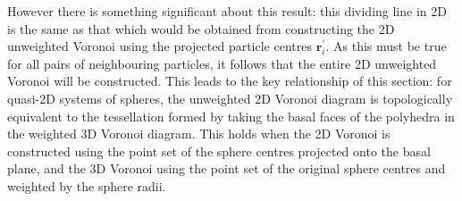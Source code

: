 However there is something significant about this result: this dividing line in 2D is the same as that which would be obtained from constructing the 2D unweighted Voronoi using the projected particle centres $\mathbf{r}^\prime_i$.
As this must be true for all pairs of neighbouring particles, it follows that the entire 2D unweighted Voronoi will be constructed. 
This leads to the key relationship of this section: for quasi\--2D systems of spheres, the unweighted 2D Voronoi diagram is topologically equivalent to the tessellation formed by taking the basal faces of the polyhedra in the weighted 3D Voronoi diagram. 
This holds when the 2D Voronoi is constructed using the point set of the sphere centres projected onto the basal plane, and the 3D Voronoi using the point set of the original sphere centres and weighted by the sphere radii.


